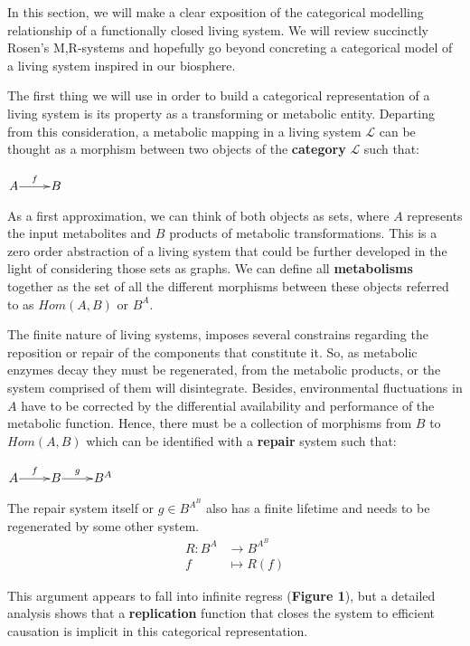 \documentclass[aps,twocolumn]{revtex4-1}
\begin{document}
In this section, we will make a clear exposition of the categorical modelling relationship of a functionally closed living system. We will review succinctly Rosen's M,R-systems and hopefully go beyond concreting a categorical model of a living system inspired in our biosphere.

The first thing we will use in order to build a categorical representation of a living system is its property as a transforming or metabolic entity. Departing from this consideration, a metabolic mapping in a living system $\mathcal{L}$ can be thought as a morphism between two objects of the \textbf{category} $\mathcal{L}$ such that:

\begin{center}
	$\xymatrix@1{
	A\ar[r]^-{f} & B
	}$

\end{center}

As a first approximation, we can think of both objects as sets, where $A$ represents the input metabolites and $B$  products of metabolic transformations. This is a zero order abstraction of a living system that could be further developed in the light of considering those sets as graphs. We can define all \textbf{metabolisms} together as the set of all the different morphisms between these objects referred to as $Hom(A,B)$ or $B^A$.

The finite nature of living systems, imposes several constrains regarding the reposition or repair of the components that constitute it. So, as metabolic enzymes decay they must be regenerated, from the metabolic products, or the system comprised of them will disintegrate. Besides, environmental fluctuations in $A$ have to be corrected by the differential availability and performance of the metabolic function. Hence, there must be a collection of morphisms from $B$ to $Hom(A,B)$ which can be identified with a \textbf{repair} system such that:


\begin{center}
	$
	\xymatrix@1{
	A\ar[r]^f &B\ar[r]^-g & B^A}
	$
\end{center}


 The repair system itself or $g \in B^{A^B}$ also has a finite lifetime and needs to be regenerated by some other system.
 \begin{align*}
R: B^A & \longrightarrow B^{A^B}\\
f & \longmapsto R(f)
\end{align*}	

This argument appears to fall into infinite regress (\textbf{Figure 1}), but a detailed analysis shows that a \textbf{replication} function that closes the system to efficient causation is implicit in this categorical representation.
\end{document}
